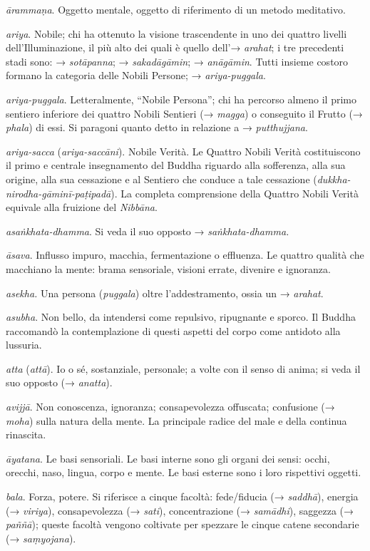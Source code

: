\emph{ārammaṇa}. Oggetto mentale, oggetto di riferimento di un metodo
meditativo.

\emph{ariya}. Nobile; chi ha ottenuto la visione trascendente in uno dei
quattro livelli dell'Illuminazione, il più alto dei quali è quello
dell'→ \emph{arahat}; i tre precedenti stadi sono: → \emph{sotāpanna}; →
\emph{sakadāgāmin}; → \emph{anāgāmin}. Tutti insieme costoro formano la
categoria delle Nobili Persone; → \emph{ariya-puggala}.

\emph{ariya-puggala}. Letteralmente, ``Nobile Persona''; chi ha percorso
almeno il primo sentiero inferiore dei quattro Nobili Sentieri (→
\emph{magga}) o conseguito il Frutto (→ \emph{phala}) di essi. Si
paragoni quanto detto in relazione a → \emph{putthujjana}.

\emph{ariya-sacca} (\emph{ariya-saccāni}). Nobile Verità. Le Quattro
Nobili Verità costituiscono il primo e centrale insegnamento del Buddha
riguardo alla sofferenza, alla sua origine, alla sua cessazione e al
Sentiero che conduce a tale cessazione
(\emph{dukkha-nirodha-gāminī-paṭipadā}). La completa comprensione della
Quattro Nobili Verità equivale alla fruizione del \emph{Nibbāna}.

\emph{asaṅkhata-dhamma}. Si veda il suo opposto →
\emph{saṅkhata-dhamma.}

\emph{āsava}. Influsso impuro, macchia, fermentazione o effluenza. Le
quattro qualità che macchiano la mente: brama sensoriale, visioni
errate, divenire e ignoranza.

\emph{asekha.} Una persona (\emph{puggala}) oltre l'addestramento, ossia
un → \emph{arahat}.

\emph{asubha}. Non bello, da intendersi come repulsivo, ripugnante e
sporco. Il Buddha raccomandò la contemplazione di questi aspetti del
corpo come antidoto alla lussuria.

\emph{atta} (\emph{attā}). Io o sé, sostanziale, personale; a volte con
il senso di anima; si veda il suo opposto (→ \emph{anatta}).

\emph{avijjā}. Non conoscenza, ignoranza; consapevolezza offuscata;
confusione (→ \emph{moha}) sulla natura della mente. La principale
radice del male e della continua rinascita.

\emph{āyatana}. Le basi sensoriali. Le basi interne sono gli organi dei
sensi: occhi, orecchi, naso, lingua, corpo e mente. Le basi esterne sono
i loro rispettivi oggetti.

\emph{bala}. Forza, potere. Si riferisce a cinque facoltà: fede/fiducia
(→ \emph{saddhā}), energia (→ \emph{viriya}), consapevolezza (→
\emph{sati}), concentrazione (→ \emph{samādhi}), saggezza (→
\emph{paññā}); queste facoltà vengono coltivate per spezzare le cinque
catene secondarie (→ \emph{saṃyojana}).

